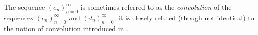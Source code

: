 \begin{rmk}\label{ii:4.4.2}
  The sequence \((e_n)_{n = 0}^\infty\) is sometimes referred to as the \emph{convolution} of the sequences \((c_n)_{n = 0}^\infty\) and \((d_n)_{n = 0}^\infty\);
  it is closely related (though not identical) to the notion of convolution introduced in .
\end{rmk}
